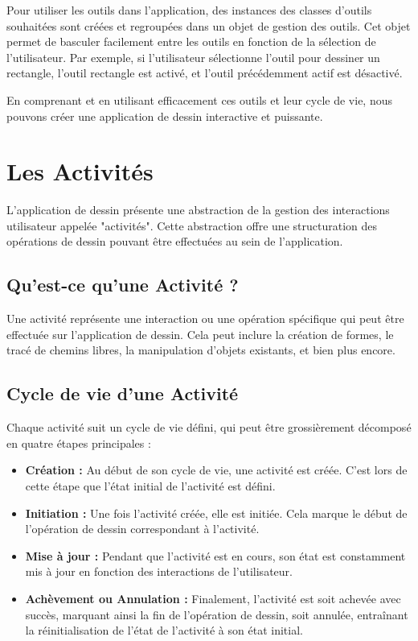 Pour utiliser les outils dans l'application, des instances des classes d'outils souhaitées sont créées et regroupées dans un objet de gestion des outils. Cet objet permet de basculer facilement entre les outils en fonction de la sélection de l'utilisateur. Par exemple, si l'utilisateur sélectionne l'outil pour dessiner un rectangle, l'outil rectangle est activé, et l'outil précédemment actif est désactivé.

En comprenant et en utilisant efficacement ces outils et leur cycle de vie, nous pouvons créer une application de dessin interactive et puissante.

\section{Les Activités}

L'application de dessin présente une abstraction de la gestion des interactions utilisateur appelée "activités". Cette abstraction offre une structuration des opérations de dessin pouvant être effectuées au sein de l'application.

\subsection{Qu'est-ce qu'une Activité ?}

Une activité représente une interaction ou une opération spécifique qui peut être effectuée sur l'application de dessin. Cela peut inclure la création de formes, le tracé de chemins libres, la manipulation d'objets existants, et bien plus encore.

\subsection{Cycle de vie d'une Activité}

Chaque activité suit un cycle de vie défini, qui peut être grossièrement décomposé en quatre étapes principales :

\begin{itemize}
    \item \textbf{Création :} Au début de son cycle de vie, une activité est créée. C'est lors de cette étape que l'état initial de l'activité est défini.
    \item \textbf{Initiation :} Une fois l'activité créée, elle est initiée. Cela marque le début de l'opération de dessin correspondant à l'activité.
    \item \textbf{Mise à jour :} Pendant que l'activité est en cours, son état est constamment mis à jour en fonction des interactions de l'utilisateur.
    \item \textbf{Achèvement ou Annulation :} Finalement, l'activité est soit achevée avec succès, marquant ainsi la fin de l'opération de dessin, soit annulée, entraînant la réinitialisation de l'état de l'activité à son état initial.
\end{itemize}

